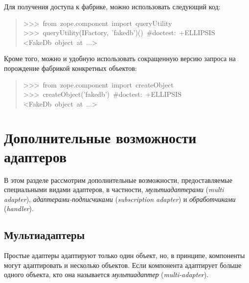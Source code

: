 \documentclass[14pt,a4paper,openany,twoside,final]{extbook}
\providecommand*{\DUroletitlereference}[1]{\textsl{#1}}
\begin{document}
Для получения доступа к фабрике, можно использовать следующий код:

\begin{quote}{\ttfamily \raggedright \noindent
>{}>{}>~from~zope.component~import~queryUtility\\
>{}>{}>~queryUtility(IFactory,~'fakedb')()~\#doctest:~+ELLIPSIS\\
<FakeDb~object~at~...>
}
\end{quote}

Кроме того, можно и удобную использовать сокращенную версию запроса на
порождение фабрикой конкретных объектов:

\begin{quote}{\ttfamily \raggedright \noindent
>{}>{}>~from~zope.component~import~createObject\\
>{}>{}>~createObject('fakedb')~\#doctest:~+ELLIPSIS\\
<FakeDb~object~at~...>
}
\end{quote}


\chapter{Дополнительные возможности адаптеров%
  \label{id44}%
}

В этом разделе рассмотрим дополнительные возможности, предоставляемые
специальными видами адаптеров, в частности, \DUroletitlereference{мультиадаптерами} (\DUroletitlereference{multi
adapter}), \DUroletitlereference{адаптерами-подписчиками} (\DUroletitlereference{subscription adapter}) и
\DUroletitlereference{обработчиками} (\DUroletitlereference{handler}).


\section{Мультиадаптеры%
  \label{id45}%
}

Простые адаптеры адаптируют только один объект, но, в принципе,
компоненты могут адаптировать и несколько объектов.  Если компонента
адаптирует больше одного объекта, кто она называется \DUroletitlereference{мультиадаптер}
(\DUroletitlereference{multi-adapter}).
\end{document}
